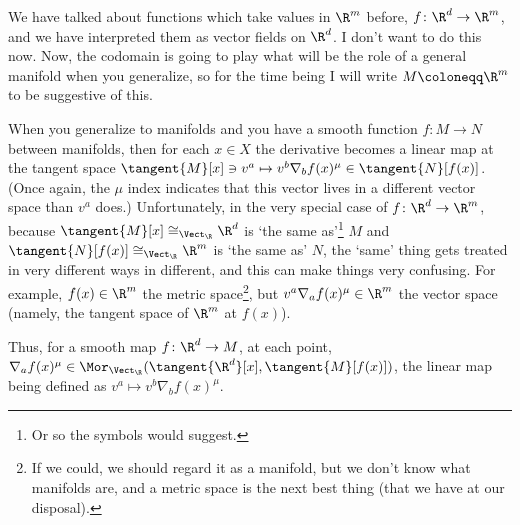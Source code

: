 We have talked about functions which take values in $\R ^m$ before, $f\colon \R ^d\rightarrow \R ^m$, and we have interpreted them as vector fields on $\R ^d$.  I don't want to do this now.  Now, the codomain is going to play what will be the role of a general manifold when you generalize, so for the time being I will write $M\coloneqq \R ^m$ to be suggestive of this.
\begin{important}
When you generalize to manifolds and you have a smooth function $f\colon M\rightarrow N$ between manifolds, then for each $x\in X$ the derivative becomes a linear map at the tangent space $\tangent{M}[x]\ni v^a\mapsto v^b\nabla _bf(x)^\mu \in \tangent{N}[f(x)]$.  (Once again, the $\mu$ index indicates that this vector lives in a different vector space than $v^a$ does.)  Unfortunately, in the very special case of $f\colon \R ^d\rightarrow \R ^m$, because $\tangent{M}[x]\cong _{\Vect _{\R}}\R ^d$ is `the same as'\footnote{Or so the symbols would suggest.} $M$ and $\tangent{N}[f(x)]\cong _{\Vect _{\R}}\R ^m$ is `the same as' $N$, the `same' thing gets treated in very different ways in different, and this can make things very confusing.  For example, $f(x)\in \R ^m$ the metric space\footnote{If we could, we should regard it as a manifold, but we don't know what manifolds are, and a metric space is the next best thing (that we have at our disposal).}, but $v^a\nabla _af(x)^\mu \in \R ^m$ the vector space (namely, the tangent space of $\R ^m$ at $f(x)$).
\end{important}
Thus, for a smooth map $f\colon \R ^d\rightarrow M$, at each point, $\nabla _af(x)^\mu \in \Mor _{\Vect _{\R}}(\tangent{\R ^d}[x],\tangent{M}[f(x)])$, the linear map being defined as $v^a\mapsto v^b\nabla _bf(x)^\mu$.

